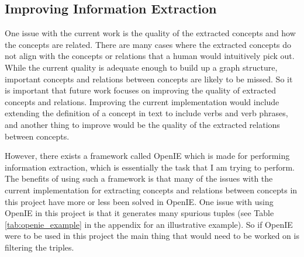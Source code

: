 \documentclass[12pt]{article}
\theoremstyle{grammarstyle}
\begin{document}
\subsection{Improving Information Extraction}
One issue with the current work is the quality of the extracted concepts and how the concepts are related. There are many cases where the extracted concepts do not align with the concepts or relations that a human would intuitively pick out. While the current quality is adequate enough to build up a graph structure, important concepts and relations between concepts are likely to be missed. So it is important that future work focuses on improving the quality of extracted concepts and relations. Improving the current implementation would include extending the definition of a concept in text to include verbs and verb phrases, and another thing to improve would be the quality of the extracted relations between concepts. 

However, there exists a framework called OpenIE \citep{banko2007open} which is made for performing information extraction, which is essentially the task that I am trying to perform. The benefits of using such a framework is that many of the issues with the current implementation for extracting concepts and relations between concepts in this project have more or less been solved in OpenIE. One issue with using OpenIE in this project is that it generates many spurious tuples (see Table \ref{tab:openie_example} in the appendix for an illustrative example). So if OpenIE were to be used in this project the main thing that would need to be worked on is filtering the triples.

\end{document}
